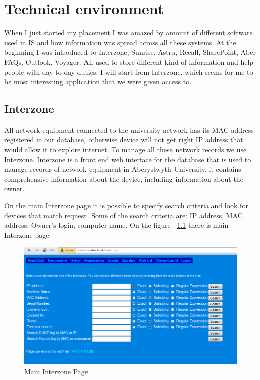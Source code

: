 \documentclass[10pt,a4paper,headinclude=true]{report}
\begin{document}
\chapter{Technical environment}
When I just started my placement I was amazed by amount of different software used in IS and how information was spread across all these systems. At the beginning I was introduced to Interzone, Sunrise, Astra, Recall, SharePoint, Aber FAQs, Outlook, Voyager. All used to store different kind of information and help people with day-to-day duties. I will start from Interzone, which seems for me to be most interesting application that we were given access to.

\section{Interzone}
All network equipment connected to the university network has its MAC address registered in our database, otherwise device will not get right IP address that would allow it to explore internet. To manage all these network records we use Interzone. 
Interzone is a front end web interface for the database that is used to manage records of network equipment in Aberystwyth University, it contains comprehensive information about the device, including information about the owner. 

On the main Interzone page it is possible to specify search criteria and look for devices that match request. Some of the search criteria are: IP address, MAC address, Owner's login, computer name. On the figure ~\ref{fig:main_interzone_page} there is main Interzone page.

\begin{figure}[H]
\centering
\centerline{\includegraphics[scale=0.5]{./main_interzone_page}}
\caption{Main Interzone Page}
\label{fig:main_interzone_page}
\end{figure}
\end{document}
